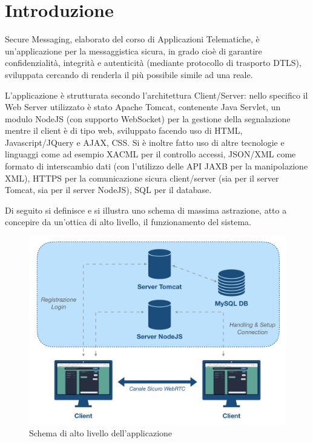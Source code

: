
\chapter{Introduzione}


Secure Messaging, elaborato del corso di Applicazioni Telematiche, è un'applicazione per la messaggistica sicura, in grado cioè di garantire confidenzialità, integrità e autenticità (mediante protocollo di trasporto DTLS), sviluppata cercando di renderla il più possibile simile ad una reale.
 
L'applicazione è strutturata secondo l'architettura Client/Server: nello specifico il Web Server utilizzato è stato Apache Tomcat, contenente Java Servlet, un modulo NodeJS (con supporto WebSocket) per la gestione della segnalazione  mentre il client è di tipo web, sviluppato facendo uso di HTML, Javascript/JQuery e AJAX, CSS.
Si è inoltre fatto uso di altre tecnologie e linguaggi come ad esempio XACML per il controllo accessi, JSON/XML come formato di interscambio dati (con l'utilizzo delle API JAXB per la manipolazione XML), HTTPS per la comunicazione sicura client/server (sia per il server Tomcat, sia per il server NodeJS), SQL per il database.

Di seguito si definisce e si illustra uno schema di massima astrazione, atto a concepire da un'ottica di alto livello, il funzionamento del sistema.

\begin{figure}[!htbp]
	\centering
	\includegraphics[scale = .6]{img/schemaGenerale}
	\caption{Schema di alto livello dell'applicazione}
	\label{gfx:schemaGenerale}
\end{figure}

